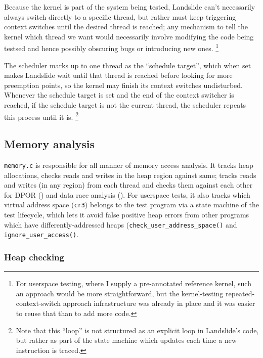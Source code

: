 Because the kernel is part of the system being tested, Landslide can't necessarily always switch directly to a specific thread,
but rather must keep triggering context switches until the desired thread is reached;
any mechanism to tell the kernel which thread we want would necessarily involve modifying the code being testsed
and hence possibly obscuring bugs or introducing new ones.%
\footnote{For userspace testing, where I supply a pre-annotated reference kernel,
such an approach would be more straightforward,
but the kernel-testing repeated-context-switch approach infrastructure was already in place
and it was easier to reuse that than to add more code.}

The scheduler marks up to one thread as the ``schedule target'',
which when set makes Landslide wait until that thread is reached before looking for more preemption points,
so the kernel may finish its context switches undisturbed.
Whenever the schedule target is set and the end of the context switcher is reached,
if the schedule target is not the current thread,
the scheduler repeats this process until it is.%
\footnote{Note that this ``loop'' is not structured as an explicit loop in Landslide's code,
but rather as part of the state machine which updates each time a new instruction is traced.}


\subsection{Memory analysis}
\label{sec:landslide-memory}

{\tt memory.c} is responsible for all manner of memory access analysis.
It tracks heap allocations, checks reads and writes in the heap region against same;
tracks reads and writes (in any region) from each thread
and checks them against each other
for DPOR (\sect{\ref{sec:landslide-dpor}})
and data race analysis (\sect{\ref{sec:landslide-datarace}}).
For userspace tests, it also tracks which virtual address space ({\tt cr3}) belongs to the test program
via a state machine of the test lifecycle,
which lets it avoid false positive heap errors from other programs which have differently-addressed heaps
({\tt check\_user\_address\_space()} and {\tt ignore\_user\_access()}.

\subsubsection{Heap checking}

